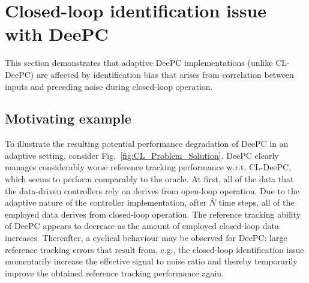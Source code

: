 \section{Closed-loop identification issue with \ac{DeePC}}\label{sec:CL_ID_issue}
%
This section demonstrates that adaptive \ac{DeePC} implementations (unlike \ac{CL-DeePC}) are affected by identification bias that arises from correlation between inputs and preceding noise during closed-loop operation.

\subsection{Motivating example}
To illustrate the resulting potential performance degradation of \ac{DeePC} in an adaptive setting, consider Fig.~\ref{fig:CL_Problem_Solution}. \ac{DeePC} clearly manages considerably worse reference tracking performance w.r.t. \ac{CL-DeePC}, which seems to perform comparably to the oracle. At first, all of the data that the data-driven controllers rely on derives from open-loop operation. Due to the adaptive nature of the controller implementation, after $\bar{N}$ time steps, all of the employed data derives from closed-loop operation. The reference tracking ability of \ac{DeePC} appears to decrease as the amount of employed closed-loop data increases. Thereafter, a cyclical behaviour may be observed for \ac{DeePC}: large reference tracking errors that result from, e.g., the closed-loop identification issue momentarily increase the effective signal to noise ratio and thereby temporarily improve the obtained reference tracking performance again.
